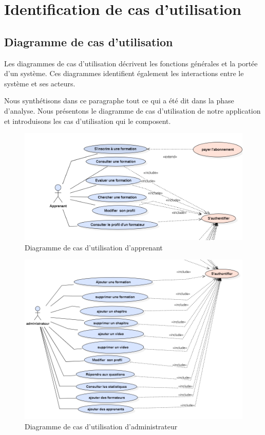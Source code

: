 \section{Identification de cas d’utilisation}

\subsection{Diagramme de cas d’utilisation}

Les diagrammes de cas d'utilisation décrivent les fonctions générales et la portée d'un système. Ces diagrammes identifient également les interactions entre le système et ses acteurs.

Nous synthétisons dans ce paragraphe tout ce qui a été dit dans la phase d’analyse. Nous présentons le diagramme de cas d’utilisation de notre application et introduisons les cas d’utilisation qui le composent.

\begin{figure}[H]
    \centering
    \includegraphics[width=15cm]{Figures/apprenant.PNG}
    \caption{Diagramme de cas d’utilisation d'apprenant}
\end{figure}

\begin{figure}[H]
    \centering
    \includegraphics[width=13cm]{Figures/administrateur.PNG}
    \caption{Diagramme de cas d’utilisation d'administrateur}
\end{figure}

